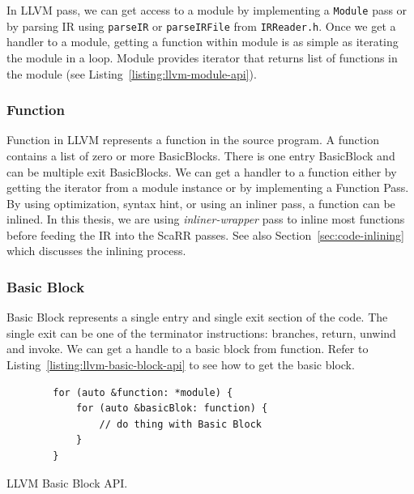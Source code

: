 In LLVM pass, we can get access to a module by implementing a \texttt{Module}
pass or by parsing IR using \texttt{parseIR} or \texttt{parseIRFile} from
\texttt{IRReader.h}. Once we get a handler to a module, getting a function
within module is as simple as iterating the module in a loop.  Module provides
iterator that returns list of functions in the module (see
Listing~\ref{listing:llvm-module-api}).


\subsubsection{Function}

Function in LLVM represents a function in the source program. A function
contains a list of zero or more BasicBlocks. There is one entry BasicBlock and
can be multiple exit BasicBlocks. We can get a handler to a function either by
getting the iterator from a module instance or by implementing a Function Pass.
By using optimization, syntax hint, or using an inliner pass, a function can be
inlined. In this thesis, we are using \emph{inliner-wrapper} pass to inline most
functions before feeding the IR into the ScaRR passes. See also
Section~\ref{sec:code-inlining} which discusses the inlining process.

\subsubsection{Basic Block}

Basic Block represents a single entry and single exit section of the code. The
single exit can be one of the terminator instructions:  branches, return, unwind
and invoke. We can get a handle to a basic block from function. Refer to
Listing~\ref{listing:llvm-basic-block-api} to see how to get the basic block.

\begin{listing}[h!]
    \begin{verbatim}
        for (auto &function: *module) {
            for (auto &basicBlok: function) {
                // do thing with Basic Block
            }
        }
    \end{verbatim}
    \caption{LLVM Basic Block API.}    
    \label{listing:llvm-basic-block-api}
\end{listing}


